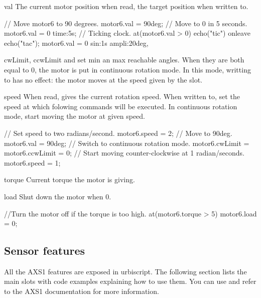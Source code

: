 \begin{urbiscriptapi}
\item[val]
  The current motor position when read, the target position when written to.

\begin{urbiunchecked}
// Move motor6 to 90 degrees.
motor6.val = 90deg;
// Move to 0 in 5 seconds.
motor6.val = 0 time:5s;
// Ticking clock.
at(motor6.val > 0) echo("tic") onleave echo("tac");
motor6.val = 0 sin:1s ampli:20deg,
\end{urbiunchecked}

\item[cwLimit, ccwLimit]
   and  set min an max reachable
  angles. When
  they are both equal to 0, the motor is put in continuous rotation mode. In
  this mode, writting to  has no effect: the motor moves at
  the speed given by the  slot.

\item[speed]
  When read, gives the current rotation speed. When written to, set the
  speed at which folowing commands will be executed. In continuous rotation
  mode, start moving the motor at given speed.
\begin{urbiunchecked}
// Set speed to two radians/second.
motor6.speed = 2;
// Move to 90deg.
motor6.val = 90deg;
// Switch to continuous rotation mode.
motor6.cwLimit = motor6.ccwLimit = 0;
// Start moving counter-clockwise at 1 radian/seconds.
motor6.speed = 1;
\end{urbiunchecked}

\item[torque]
  Current torque the motor is giving.

\item[load]
  Shut down the motor when 0.

\begin{urbiunchecked}
//Turn the motor off if the torque is too high.
at(motor6.torque > 5) motor6.load = 0;
\end{urbiunchecked}

\end{urbiscriptapi}

\subsection{Sensor features}
\def\currentObject{AXS1}
All the AXS1 features are exposed in urbiscript. The following section
lists the main slots with code examples explaining how to use them.
You can use  and refer to the AXS1
documentation for more information.


